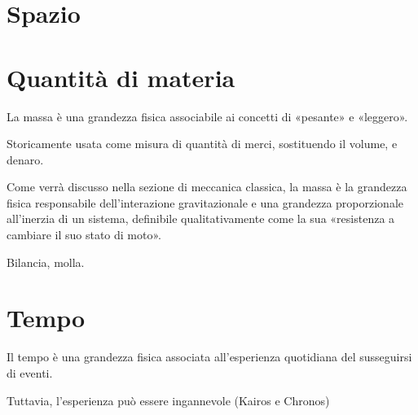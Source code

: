 \documentclass[letterpaper,10pt,italian]{jupyterBook}
\begin{document}
\sphinxAtStartPar
{}

\sphinxAtStartPar
{}



\sphinxstepscope


\section{Spazio}
\label{\detokenize{ch/intro/physical_quantities-space:spazio}}\label{\detokenize{ch/intro/physical_quantities-space:physics-hs-intro-physical-quantities-space}}\label{\detokenize{ch/intro/physical_quantities-space::doc}}
\sphinxstepscope


\section{Quantità di materia}
\label{\detokenize{ch/intro/physical_quantities-mass:quantita-di-materia}}\label{\detokenize{ch/intro/physical_quantities-mass:physics-hs-intro-physical-quantities-mass}}\label{\detokenize{ch/intro/physical_quantities-mass::doc}}
\sphinxAtStartPar
La massa è una grandezza fisica associabile ai concetti di «pesante» e «leggero».

\sphinxAtStartPar
Storicamente usata come misura di quantità di merci, sostituendo il volume, e denaro.

\sphinxAtStartPar
Come verrà discusso nella sezione di meccanica classica, la massa è la grandezza fisica responsabile dell’interazione gravitazionale e una grandezza proporzionale all’inerzia di un sistema, definibile qualitativamente come la sua «resistenza a cambiare il suo stato di moto».

\sphinxAtStartPar
{} Bilancia, molla.

\sphinxstepscope


\section{Tempo}
\label{\detokenize{ch/intro/physical_quantities-time:tempo}}\label{\detokenize{ch/intro/physical_quantities-time:physics-hs-intro-physical-quantities-time}}\label{\detokenize{ch/intro/physical_quantities-time::doc}}
\sphinxAtStartPar
Il tempo è una grandezza fisica associata all’esperienza quotidiana del susseguirsi di eventi.

\sphinxAtStartPar
Tuttavia, l’esperienza può essere ingannevole (Kairos e Chronos)
\end{document}
